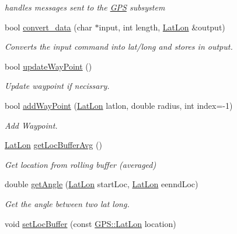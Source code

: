 \begin{DoxyCompactItemize}
\begin{DoxyCompactList}\small\item\em handles messages sent to the \hyperlink{classGPS}{G\-P\-S} subsystem \end{DoxyCompactList}\item 
\hypertarget{classGPS_abb0d819282c6575d1c9dfadce5270238}{bool \hyperlink{classGPS_abb0d819282c6575d1c9dfadce5270238}{convert\-\_\-data} (char $\ast$input, int length, \hyperlink{classGPS_1_1LatLon}{Lat\-Lon} \&output)}\label{classGPS_abb0d819282c6575d1c9dfadce5270238}

\begin{DoxyCompactList}\small\item\em Converts the input command into lat/long and stores in output. \end{DoxyCompactList}\item 
\hypertarget{classGPS_ae6fac25305f26521d3cb313608224cbf}{bool \hyperlink{classGPS_ae6fac25305f26521d3cb313608224cbf}{update\-Way\-Point} ()}\label{classGPS_ae6fac25305f26521d3cb313608224cbf}

\begin{DoxyCompactList}\small\item\em Update waypoint if necissary. \end{DoxyCompactList}\item 
\hypertarget{classGPS_a2a02aee137990e44240c60148d4dd892}{bool \hyperlink{classGPS_a2a02aee137990e44240c60148d4dd892}{add\-Way\-Point} (\hyperlink{classGPS_1_1LatLon}{Lat\-Lon} latlon, double radius, int index=-\/1)}\label{classGPS_a2a02aee137990e44240c60148d4dd892}

\begin{DoxyCompactList}\small\item\em Add Waypoint. \end{DoxyCompactList}\item 
\hypertarget{classGPS_a5c2fe388fb6d9f324f9f00e1abdfd5ed}{\hyperlink{classGPS_1_1LatLon}{Lat\-Lon} \hyperlink{classGPS_a5c2fe388fb6d9f324f9f00e1abdfd5ed}{get\-Loc\-Buffer\-Avg} ()}\label{classGPS_a5c2fe388fb6d9f324f9f00e1abdfd5ed}

\begin{DoxyCompactList}\small\item\em Get location from rolling buffer (averaged) \end{DoxyCompactList}\item 
double \hyperlink{classGPS_a142cd2ff428450d1145ddaaa4e2974a8}{get\-Angle} (\hyperlink{classGPS_1_1LatLon}{Lat\-Lon} start\-Loc, \hyperlink{classGPS_1_1LatLon}{Lat\-Lon} eennd\-Loc)
\begin{DoxyCompactList}\small\item\em Get the angle between two lat long. \end{DoxyCompactList}\item 
\hypertarget{classGPS_a988b4a8104bc8e93d1225cad026ce578}{void \hyperlink{classGPS_a988b4a8104bc8e93d1225cad026ce578}{set\-Loc\-Buffer} (const \hyperlink{classGPS_1_1LatLon}{G\-P\-S\-::\-Lat\-Lon} location)}\label{classGPS_a988b4a8104bc8e93d1225cad026ce578}


\end{DoxyCompactItemize}

